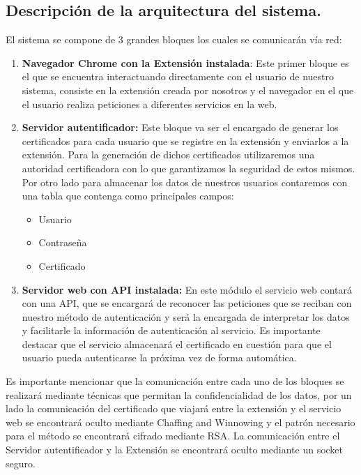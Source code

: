 \documentclass[12pt, a4paper, titlepage]{report}
\begin{document}
	        \subsection{Descripci\'on de la arquitectura del sistema.}
	            El sistema se compone de 3 grandes bloques los cuales se comunicar\'an v\'ia red:
	            \begin{enumerate}
	                \item \textbf{Navegador Chrome con la Extensi\'on instalada}: Este primer bloque es el que se encuentra interactuando directamente con el usuario de nuestro sistema, consiste en la extensión creada por nosotros y el navegador en el que el usuario realiza peticiones a diferentes servicios en la web.
	                \item \textbf{Servidor autentificador:} Este bloque va ser el encargado de generar los certificados para cada usuario que se registre en la extensión y enviarlos a la extensión. Para la generación de dichos certificados utilizaremos una autoridad certificadora con lo que garantizamos la seguridad de estos mismos. Por otro lado para almacenar los datos de nuestros usuarios contaremos con una tabla que contenga como principales campos:
	                    \begin{itemize}
	                        \item Usuario
	                        \item Contraseña
	                        \item Certificado
	                    \end{itemize}
	                \item \textbf{Servidor web con API instalada: }En este módulo el servicio web contar\'a con una API, que se encargará de reconocer las peticiones que se reciban con nuestro método de autenticación y ser\'a la encargada de interpretar los datos y facilitarle la informaci\'on de autenticaci\'on al servicio.
	                Es importante destacar que el servicio almacenar\'a el certificado en cuesti\'on para que el usuario pueda autenticarse la próxima vez de forma automática.
	            \end{enumerate}
	        
	        Es importante mencionar que la comunicaci\'on entre cada uno de los bloques se realizar\'a mediante t\'ecnicas que permitan la confidencialidad de los datos, por un lado la comunicación del certificado que viajará entre la extensión y el servicio web se encontrará oculto mediante Chaffing and Winnowing y el patr\'on necesario para el m\'etodo se encontrar\'a cifrado mediante RSA. La comunicación entre el Servidor autentificador y la Extensión se encontrar\'a oculto mediante un socket seguro. 
    	
\end{document}
